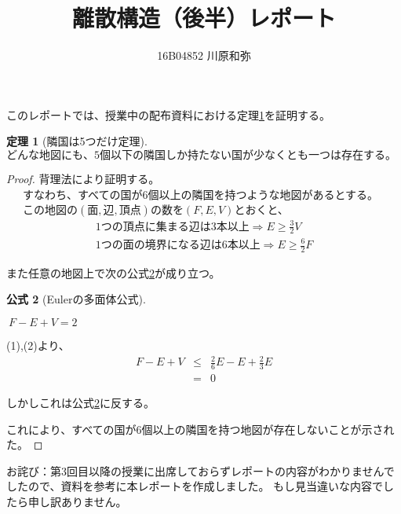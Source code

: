 \documentclass{jsarticle}
\newtheorem{thm}{定理}
\newtheorem{fom}[thm]{公式}
\begin{document}
\title{離散構造（後半）レポート}
\author{16B04852 川原和弥}
\maketitle

このレポートでは、授業中の配布資料における定理\ref{ringoku}を証明する。

\begin{thm}[隣国は5つだけ定理]
    \label{ringoku}
    $どんな地図にも、5個以下の隣国しか持たない国が少なくとも一つは存在する。$
\end{thm}

\begin{proof}
    背理法により証明する。\\
    \ \ \ すなわち、すべての国が6個以上の隣国を持つような地図があるとする。\\
    \ \ \ この地図の$(面,辺,頂点)$の数を$(F,E,V)$とおくと、
    \begin{eqnarray}
    1つの頂点に集まる辺は3本以上 \Rightarrow  E \geq \frac{3}{2} V \\
    1つの面の境界になる辺は6本以上 \Rightarrow  E \geq \frac{6}{2} F
    \end{eqnarray}

    また任意の地図上で次の公式\ref{Euler}が成り立つ。\\

    
    \begin{fom}[Eulerの多面体公式]
        \label{Euler}
        \begin{center}$\ F - E + V = 2$\end{center}
    \end{fom}


    (1),(2)より、
    \begin{eqnarray}
    F - E + V &\leq& \frac{2}{6} E - E + \frac{2}{3} E \nonumber \\
    &=& 0 \nonumber
    \end{eqnarray}

    しかしこれは公式\ref{Euler}に反する。

    これにより、すべての国が6個以上の隣国を持つ地図が存在しないことが示された。

\end{proof}

お詫び：第3回目以降の授業に出席しておらずレポートの内容がわかりませんでしたので、資料を参考に本レポートを作成しました。
もし見当違いな内容でしたら申し訳ありません。
\end{document}
